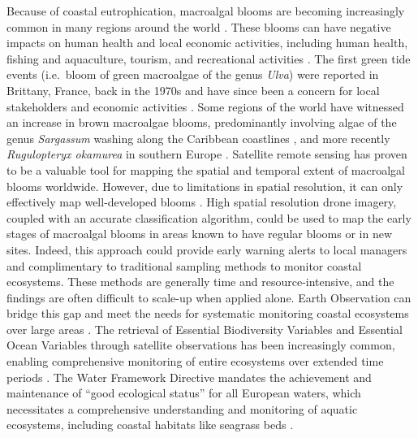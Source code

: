 \documentclass[
  number]{elsarticle}
\begin{document}
Because of coastal eutrophication, macroalgal blooms are becoming
increasingly common in many regions around the world \citetext{\citealp[
]{sutton2011european}; \citealp{ye2011green}}. These blooms can have
negative impacts on human health and local economic activities,
including human health, fishing and aquaculture, tourism, and
recreational activities \citetext{\citealp[
]{villares1999nitrogen}; \citealp{ye2011green}}. The first green tide
events (i.e.~bloom of green macroalgae of the genus \emph{Ulva}) were
reported in Brittany, France, back in the 1970s and have since been a
concern for local stakeholders and economic activities
\citep{menesguen2018marees}. Some regions of the world have witnessed an
increase in brown macroalgae blooms, predominantly involving algae of
the genus \emph{Sargassum} washing along the Caribbean coastlines
\citep{louime2017sargassum}, and more recently \emph{Rugulopteryx
okamurea} in southern Europe \citep{Roca2022}. Satellite remote sensing
has proven to be a valuable tool for mapping the spatial and temporal
extent of macroalgal blooms worldwide. However, due to limitations in
spatial resolution, it can only effectively map well-developed blooms
\citetext{\citealp[ ]{rs13081408}; \citealp[
]{klemas2012remote}; \citealp{haro2023biointertidal}}. High spatial
resolution drone imagery, coupled with an accurate classification
algorithm, could be used to map the early stages of macroalgal blooms in
areas known to have regular blooms or in new sites. Indeed, this
approach could provide early warning alerts to local managers and
complimentary to traditional sampling methods to monitor coastal
ecosystems. These methods are generally time and resource-intensive, and
the findings are often difficult to scale-up when applied alone. Earth
Observation can bridge this gap and meet the needs for systematic
monitoring coastal ecosystems over large areas
\citep{papathanasopoulou2019satellite}. The retrieval of Essential
Biodiversity Variables and Essential Ocean Variables through satellite
observations has been increasingly common, enabling comprehensive
monitoring of entire ecosystems over extended time periods
\citetext{\citealp[ ]{ratnarajah2023monitoring}; \citealp{Zoffoli2021}}.
The Water Framework Directive \citep{WFD2000} mandates the achievement
and maintenance of ``good ecological status'' for all European waters,
which necessitates a comprehensive understanding and monitoring of
aquatic ecosystems, including coastal habitats like seagrass beds
\citetext{\citealp[ ]{foden2007angiosperms}; \citealp[
]{nordlund2024one}; \citealp{Zoffoli2021}}.
\end{document}
